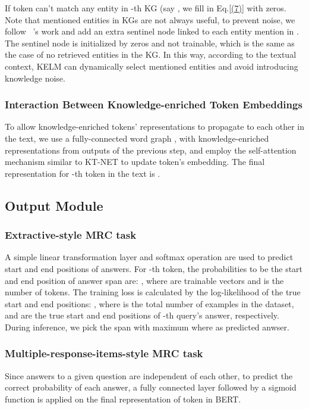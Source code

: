 \documentclass{article} \usepackage{iclr2022_conference,times}
\begin{document}
If token  can't match any entity in -th KG (say , we fill  in Eq.\ref{(7)} with zeros. Note that mentioned entities in KGs are not always useful, to prevent noise, we follow ~\citep{yang-mitchell-2017-leveraging}'s work and add an extra sentinel node linked to each entity mention in . The sentinel node is initialized by zeros and not trainable, which is the same as the case of no retrieved entities in the KG. In this way, according to the textual context, KELM can dynamically select mentioned entities and avoid introducing knowledge noise.

\subsubsection{Interaction Between Knowledge-enriched Token Embeddings}
To allow knowledge-enriched tokens' representations to propagate to each other in the text, we use a fully-connected word graph , with knowledge-enriched representations from outputs of the previous step, and employ the self-attention mechanism similar to KT-NET to update token's embedding. The final representation for -th token in the text is .

\subsection{Output Module}
\subsubsection{Extractive-style MRC task} 
A simple linear transformation layer and softmax operation are used to predict start and end positions of answers. For -th token, the probabilities to be the start and end position of answer span are:
, where  are trainable vectors and  is the number of tokens. The training loss is calculated by the log-likelihood of the true start and end positions: ,
\noindent where  is the total number of examples in the dataset,  and  are the true start and end positions of -th query's answer, respectively. During inference, we pick the span  with maximum  where  as predicted anwser. 

\subsubsection{Multiple-response-items-style MRC task}
Since answers to a given question are independent of each other, to predict the correct probability of each answer, a fully connected layer followed by a sigmoid function is applied on the final representation of  token in BERT. 
\end{document}

